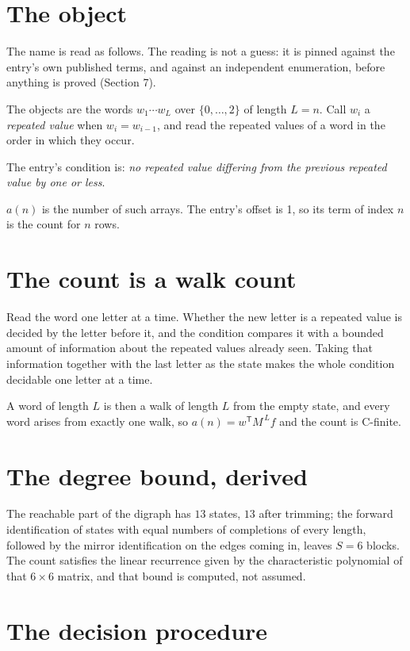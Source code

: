 \documentclass[11pt]{article}
\theoremstyle{definition}
\begin{document}
\section{The object}

The name is read as follows. The reading is not a guess: it is pinned against the entry's own published terms, and against an independent enumeration, before anything is proved (Section 7).

The objects are the words $w_1\cdots w_L$ over $\{0,\dots,2\}$ of length $L = n$. Call $w_i$ a {\itshape repeated value} when $w_i = w_{i-1}$, and read the repeated values of a word in the order in which they occur.

The entry's condition is: {\itshape no repeated value differing from the previous repeated value by one or less}.

$a(n)$ is the number of such arrays. The entry's offset is 1, so its term of index $n$ is the count for $n$ rows.

\section{The count is a walk count}

Read the word one letter at a time. Whether the new letter is a repeated value is decided by the letter before it, and the condition compares it with a bounded amount of information about the repeated values already seen. Taking that information together with the last letter as the state makes the whole condition decidable one letter at a time.

A word of length $L$ is then a walk of length $L$ from the empty state, and every word arises from exactly one walk, so $a(n) = w^{\mathsf T}M^{\,L}f$ and the count is C-finite.

\section{The degree bound, derived}

The reachable part of the digraph has $13$ states, $13$ after trimming; the forward identification of states with equal numbers of completions of every length, followed by the mirror identification on the edges coming in, leaves $S = 6$ blocks. The count satisfies the linear recurrence given by the characteristic polynomial of that $6\times6$ matrix, and that bound is computed, not assumed.

\section{The decision procedure}
\end{document}
